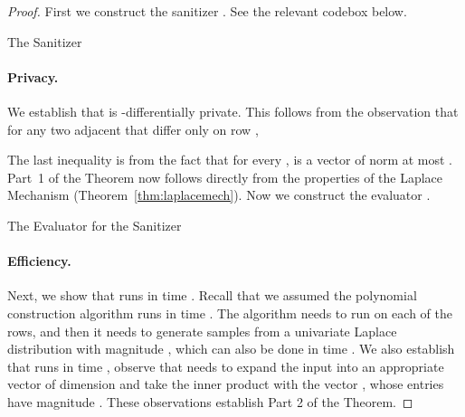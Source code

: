 \documentclass[11pt]{article}
\newcommand{\INDSTATE}[1][1]{\STATE\hspace{#1\algorithmicindent}}
\theoremstyle{definition}
\begin{document}
\begin{proof}
First we construct the sanitizer . See the relevant codebox below.

\begin{algorithm}
The Sanitizer 
\begin{algorithmic}
\INDSTATE[1]{Using efficient approximation of  by , compute a polynomial  that -approximates  on .}
\end{algorithmic}
\label{codebox1}
\end{algorithm}
\paragraph{Privacy.}
We establish that  is -differentially private.  This follows from the observation that for any two adjacent  that differ only on row ,

The last inequality is from the fact that for every ,  is a vector of  norm at most .  Part~1 of the Theorem now follows directly from the properties of the Laplace Mechanism (Theorem~\ref{thm:laplacemech}).
Now we construct the evaluator .
\begin{algorithm}
The Evaluator  for the Sanitizer 
\begin{algorithmic}
\end{algorithmic}
\end{algorithm}

\paragraph{Efficiency.}
Next, we show that  runs in time .  Recall that we assumed the polynomial construction algorithm  runs in time .  The algorithm  needs to run  on each of the  rows, and then it needs to generate  samples from a univariate Laplace distribution with magnitude , which can also be done in time .  We also establish that  runs in time , observe that  needs to expand the input into an appropriate vector of dimension  and take the inner product with the vector , whose entries have magnitude .  These observations establish Part 2 of the Theorem.


\end{proof}
\end{document}

